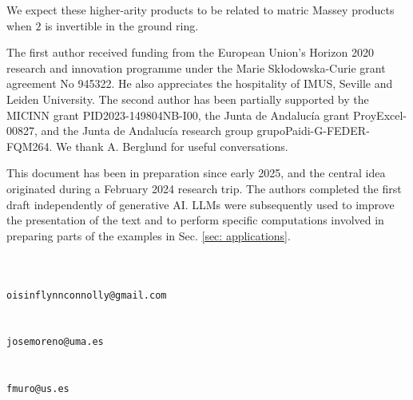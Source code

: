 \documentclass[11pt]{article}
\theoremstyle{definition}
\theoremstyle{definition}
\begin{document}
We expect these higher-arity products to be related to matric Massey products when $2$ is invertible in the ground ring.






























\smallskip

The first author received funding from the European Union’s Horizon 2020 research and innovation programme under the Marie Skłodowska-Curie grant agreement No 945322. 
He also appreciates the hospitality of IMUS, Seville and Leiden University.
The second author has been partially supported by the MICINN grant PID2023-149804NB-I00,
the Junta de Andalucía grant ProyExcel-00827, 
and the Junta de Andalucía research group grupoPaidi-G-FEDER-FQM264. 
We thank A. Berglund for useful conversations. 

\medskip

This document has been in preparation since early 2025, and the central idea originated during a February 2024 research trip.
The authors completed the first draft independently of generative AI. 
LLMs were subsequently used to improve the presentation of the text and to perform specific 
computations involved in preparing parts of the examples in Sec. \ref{sec: applications}. 





\bigskip

\noindent{}\\ 
\noindent{}\\
\noindent\tt{oisinflynnconnolly@gmail.com}\\

\noindent{}\\ 
\noindent{}\\
\noindent\tt{josemoreno@uma.es}\\

\noindent{}\\
\noindent{}\\
\noindent\tt{fmuro@us.es}\\
 
\end{document}
